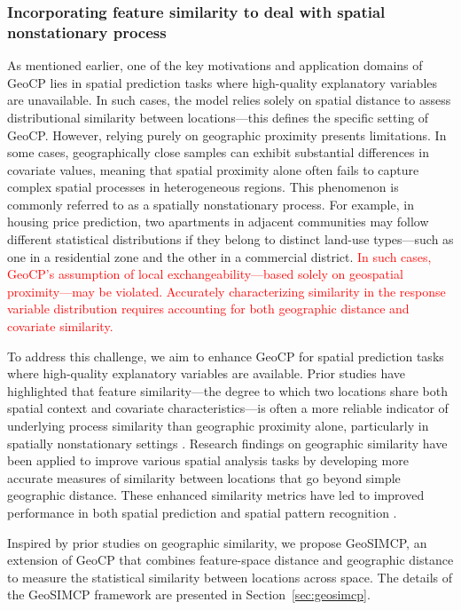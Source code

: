\documentclass[authoryear,preprint,review,12pt]{elsarticle}
\begin{document}
\subsubsection{Incorporating feature similarity to deal with spatial nonstationary process}

As mentioned earlier, one of the key motivations and application domains of GeoCP lies in spatial prediction tasks where high-quality explanatory variables are unavailable. In such cases, the model relies solely on spatial distance to assess distributional similarity between locations—this defines the specific setting of GeoCP. However, relying purely on geographic proximity presents limitations. In some cases, geographically close samples can exhibit substantial differences in covariate values, meaning that spatial proximity alone often fails to capture complex spatial processes in heterogeneous regions. This phenomenon is commonly referred to as a spatially nonstationary process. For example, in housing price prediction, two apartments in adjacent communities may follow different statistical distributions if they belong to distinct land-use types—such as one in a residential zone and the other in a commercial district. \textcolor{red}{In such cases, GeoCP’s assumption of local exchangeability—based solely on geospatial proximity—may be violated. Accurately characterizing similarity in the response variable distribution requires accounting for both geographic distance and covariate similarity.}

To address this challenge, we aim to enhance GeoCP for spatial prediction tasks where high-quality explanatory variables are available. Prior studies have highlighted that feature similarity—the degree to which two locations share both spatial context and covariate characteristics—is often a more reliable indicator of underlying process similarity than geographic proximity alone, particularly in spatially nonstationary settings \citep{zhu2022third,luo2024generalized}. Research findings on geographic similarity have been applied to improve various spatial analysis tasks by developing more accurate measures of similarity between locations that go beyond simple geographic distance. These enhanced similarity metrics have led to improved performance in both spatial prediction \citep{zhao2023spatial} and spatial pattern recognition \citep{zhao2025multivariate}.

Inspired by prior studies on geographic similarity, we propose GeoSIMCP, an extension of GeoCP that combines feature-space distance and geographic distance to measure the statistical similarity between locations across space. The details of the GeoSIMCP framework are presented in Section~\ref{sec:geosimcp}.
\end{document}
